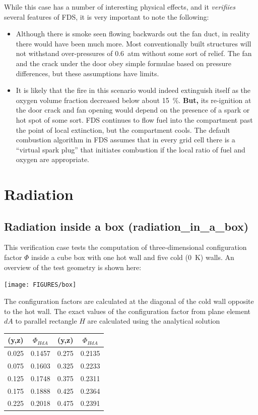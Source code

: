 \documentclass[11pt]{book}
\begin{document}
While this case has a number of interesting physical effects, and it {\em verifiies} several features of FDS, it is very important to note the following:
\begin{itemize}
\item Although there is smoke seen flowing backwards out the fan duct, in reality there would have been much more. Most conventionally built structures will not withstand over-pressures
of 0.6~atm without some sort of relief. The fan and the crack under the door obey simple formulae based on pressure differences, but these assumptions have limits.
\item It is likely that the fire in this scenario would indeed extinguish itself as the oxygen volume fraction decreased below about 15~\%. {\bf But,} its re-ignition at the door crack
and fan opening would depend on the presence of a spark or hot spot of some sort. FDS continues to flow fuel into the compartment past the point of local extinction, but the compartment
cools. The default combustion algorithm in FDS assumes that in every grid cell there is a ``virtual spark plug'' that initiates combustion if the local ratio of fuel and oxygen are
appropriate.
\end{itemize}





\clearpage

\section{Radiation}

\subsection{Radiation inside a box ({\bf radiation\_in\_a\_box}) }

This verification case tests the computation of three-dimensional
configuration factor $\Phi$ inside a cube box with one hot wall and
five cold (0~K) walls. An overview of the test geometry is shown here:
\begin{center}
\texttt{[image: FIGURES/box]}
\end{center}
The configuration factors are calculated at the
diagonal of the cold wall opposite to the hot wall. The exact values of the configuration factor
from plane element $dA$ to parallel rectangle $H$
are calculated using the analytical solution~\cite{Siegel:1}

\begin{center}
\begin{tabular}{|c|c|c|c|}
\hline (y,z) & $\Phi_{HdA}$ & (y,z) & $\Phi_{HdA}$ \\ \hline \hline
0.025   &0.1457 & 0.275 &0.2135 \\
0.075   &0.1603 & 0.325 &0.2233 \\
0.125   &0.1748 & 0.375 &0.2311 \\
0.175   &0.1888 & 0.425 &0.2364 \\
0.225   &0.2018 & 0.475 &0.2391 \\ \hline
\end{tabular}
\end{center}
\end{document}
